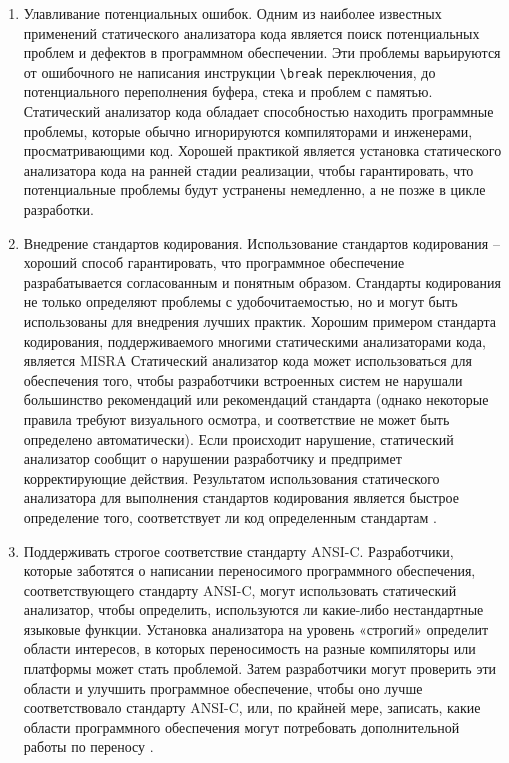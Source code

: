 \begin{enumerate}

    \item Улавливание потенциальных ошибок. Одним из наиболее известных применений статического анализатора кода является поиск потенциальных проблем и дефектов в программном обеспечении. Эти проблемы варьируются от ошибочного не написания инструкции \verb          |\break| переключения, до потенциального переполнения буфера, стека и проблем с памятью. Статический анализатор кода обладает способностью находить программные проблемы, которые обычно игнорируются компиляторами и инженерами, просматривающими код. Хорошей практикой является установка статического анализатора кода на ранней стадии реализации, чтобы гарантировать, что потенциальные проблемы будут устранены немедленно, а не позже в цикле разработки.

    \item Внедрение стандартов кодирования. Использование стандартов кодирования -- хороший способ гарантировать, что программное обеспечение разрабатывается согласованным и понятным образом. Стандарты кодирования не только определяют проблемы с удобочитаемостью, но и могут быть использованы для внедрения лучших практик. Хорошим примером стандарта кодирования, поддерживаемого многими статическими анализаторами кода, является MISRA Статический анализатор кода может использоваться для обеспечения того, чтобы разработчики встроенных систем не нарушали большинство рекомендаций или рекомендаций стандарта (однако некоторые правила требуют визуального осмотра, и соответствие не может быть определено автоматически). Если происходит нарушение, статический анализатор сообщит о нарушении разработчику и предпримет корректирующие действия. Результатом использования статического анализатора для выполнения стандартов кодирования является быстрое определение того, соответствует ли код определенным стандартам \cite{8,9}.
    
    \item Поддерживать строгое соответствие стандарту ANSI-C. Разработчики, которые заботятся о написании переносимого программного обеспечения, соответствующего стандарту ANSI-C, могут использовать статический анализатор, чтобы определить, используются ли какие-либо нестандартные языковые функции. Установка анализатора на уровень «строгий» определит области интересов, в которых переносимость на разные компиляторы или платформы может стать проблемой. Затем разработчики могут проверить эти области и улучшить программное обеспечение, чтобы оно лучше соответствовало стандарту ANSI-C, или, по крайней мере, записать, какие области программного обеспечения могут потребовать дополнительной работы по переносу \cite{10,11}.
    

\end{enumerate}
